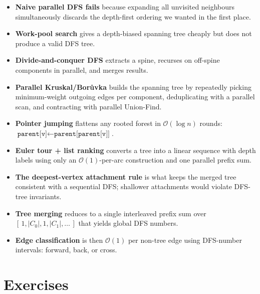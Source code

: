 \begin{ppnote}
\begin{itemize}
  \item \textbf{Naive parallel DFS fails} because expanding all unvisited
        neighbours simultaneously discards the depth-first ordering we
        wanted in the first place.
  \item \textbf{Work-pool search} gives a depth-biased spanning tree
        cheaply but does not produce a valid DFS tree.
  \item \textbf{Divide-and-conquer DFS} extracts a spine, recurses on
        off-spine components in parallel, and merges results.
  \item \textbf{Parallel Kruskal/Bor{\r u}vka} builds the spanning tree
        by repeatedly picking minimum-weight outgoing edges per
        component, deduplicating with a parallel scan, and contracting
        with parallel Union-Find.
  \item \textbf{Pointer jumping} flattens any rooted forest in
        $\mathcal{O}(\log n)$ rounds: $\texttt{parent[v]} \leftarrow
        \texttt{parent[parent[v]]}$.
  \item \textbf{Euler tour + list ranking} converts a tree into a
        linear sequence with depth labels using only an
        $\mathcal{O}(1)$-per-arc construction and one parallel prefix sum.
  \item \textbf{The deepest-vertex attachment rule} is what keeps the
        merged tree consistent with a sequential DFS; shallower
        attachments would violate DFS-tree invariants.
  \item \textbf{Tree merging} reduces to a single interleaved prefix sum
        over $[\,1, |C_0|, 1, |C_1|, \ldots\,]$ that yields global DFS
        numbers.
  \item \textbf{Edge classification} is then $\mathcal{O}(1)$ per non-tree
        edge using DFS-number intervals: forward, back, or cross.
\end{itemize}
\end{ppnote}

\section{Exercises}

